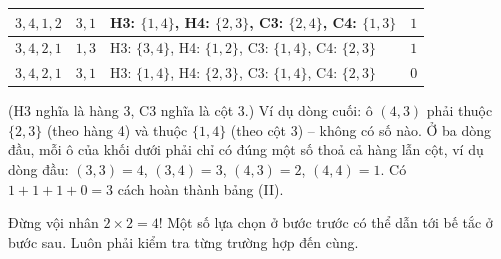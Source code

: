 {\begin{center}
\begin{tabular}{|c|c|l|c|}
$3, 4, 1, 2$ & $3, 1$ & H3: $\{1,4\}$, H4: $\{2,3\}$, C3: $\{2,4\}$, C4: $\{1,3\}$ & $1$\\ \hline
$3, 4, 2, 1$ & $1, 3$ & H3: $\{3,4\}$, H4: $\{1,2\}$, C3: $\{1,4\}$, C4: $\{2,3\}$ & $1$\\ \hline
$3, 4, 2, 1$ & $3, 1$ & H3: $\{1,4\}$, H4: $\{2,3\}$, C3: $\{1,4\}$, C4: $\{2,3\}$ & $0$\\ \hline
\end{tabular}
\end{center}
(H3 nghĩa là hàng 3, C3 nghĩa là cột 3.) Ví dụ dòng cuối: ô $(4,3)$ phải thuộc $\{2,3\}$ (theo hàng 4) và thuộc $\{1,4\}$ (theo cột 3) -- không có số nào. Ở ba dòng đầu, mỗi
ô của khối dưới phải chỉ có đúng một số thoả cả hàng lẫn cột, ví dụ dòng đầu: $(3,3) = 4$, $(3,4) = 3$, $(4,3) = 2$, $(4,4) = 1$.
Có $1 + 1 + 1 + 0 = 3$ cách hoàn thành bảng (II).
\begin{figC}
\begin{scope}[xshift=0cm]\end{scope}
\begin{scope}[xshift=4.1cm]\end{scope}
\begin{scope}[xshift=8.2cm]\end{scope}
\end{figC}
\begin{warnbox}Đừng vội nhân $2\times 2 = 4$! Một số lựa chọn ở bước trước có thể dẫn tới bế tắc ở bước sau. Luôn phải kiểm tra từng
trường hợp đến cùng.\end{warnbox}
}

